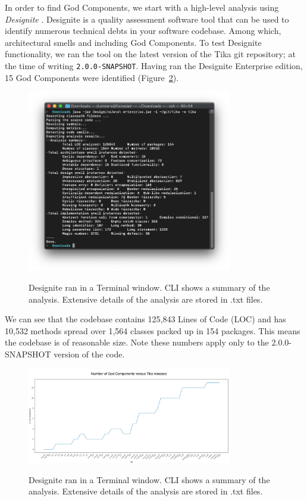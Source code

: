\documentclass[../../main.tex]{subfiles}
\begin{document}
In order to find God Components, we start with a high-level analysis using \textit{Designite} \citep{sharma2016designite}. Designite is a quality assessment software tool that can be used to identify numerous technical debts in your software codebase. Among which, architectural smells and including God Components. To test Designite functionality, we ran the tool on the latest version of the Tika git repository; at the time of writing \texttt{2.0.0-SNAPSHOT}. Having ran the Designite Enterprise edition, 15 God Components were identified (Figure~\ref{fig:designite/cli_analysis}).

\begin{figure}[ht]
    \centering
    \includegraphics[width=0.8\textwidth]{report/images/designite/cli_analysis.png}
    \label{fig:designite/cli_analysis}
    \caption{Designite ran in a Terminal window. CLI shows a summary of the analysis. Extensive details of the analysis are stored in .txt files.}
\end{figure}

We can see that the codebase contains 125,843 Lines of Code (LOC) and has 10,532 methods spread over 1,564 classes packed up in 154 packages. This means the codebase is of reasonable size. Note these numbers apply only to the 2.0.0-SNAPSHOT version of the code. 

\begin{figure}[ht]
    \centering
    \includegraphics[width=0.8\textwidth]{report/images/designite/gcs-versus-tags.png}
    \label{fig:designite/cli_analysis}
    \caption{Designite ran in a Terminal window. CLI shows a summary of the analysis. Extensive details of the analysis are stored in .txt files.}
\end{figure}
\end{document}
